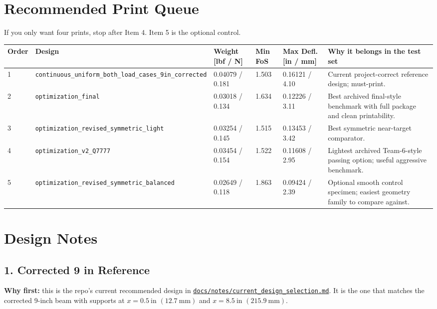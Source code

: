 \documentclass[11pt]{article}
\newcommand{\pathlink}[1]{\href{run:#1}{\nolinkurl{#1}}}
\newcommand{\designid}[1]{\nolinkurl{#1}}
\begin{document}
\section*{Recommended Print Queue}

If you only want four prints, stop after Item 4. Item 5 is the optional control.

\small
\begin{longtable}{@{}p{}p{}p{}p{}p{}p{}@{}}
\toprule
Order & Design & Weight [lbf / N] & Min FoS & Max Defl. [in / mm] & Why it belongs in the test set \\
\midrule
\endhead
1 & \designid{continuous_uniform_both_load_cases_9in_corrected} & 0.04079 / 0.181 & 1.503 & 0.16121 / 4.10 & Current project-correct reference design; must-print. \\
2 & \designid{optimization_final} & 0.03018 / 0.134 & 1.634 & 0.12226 / 3.11 & Best archived final-style benchmark with full package and clean printability. \\
3 & \designid{optimization_revised_symmetric_light} & 0.03254 / 0.145 & 1.515 & 0.13453 / 3.42 & Best symmetric near-target comparator. \\
4 & \designid{optimization_v2_Q7777} & 0.03454 / 0.154 & 1.522 & 0.11608 / 2.95 & Lightest archived Team-6-style passing option; useful aggressive benchmark. \\
5 & \designid{optimization_revised_symmetric_balanced} & 0.02649 / 0.118 & 1.863 & 0.09424 / 2.39 & Optional smooth control specimen; easiest geometry family to compare against. \\
\bottomrule
\end{longtable}
\normalsize

\section*{Design Notes}

\subsection*{1. Corrected 9 in Reference}

\textbf{Why first:} this is the repo's current recommended design in
\pathlink{docs/notes/current_design_selection.md}. It is the one that matches
the corrected 9-inch beam with supports at \(x=0.5\ \mathrm{in}\)
\((12.7\ \mathrm{mm})\) and \(x=8.5\ \mathrm{in}\)
\((215.9\ \mathrm{mm})\).
\end{document}
